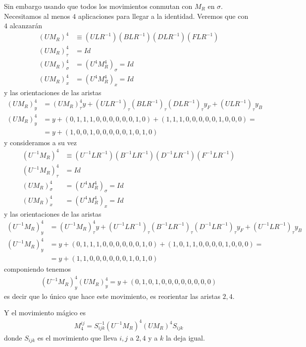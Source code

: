\documentclass{article}
\theoremstyle{definition}
\begin{document}
Sin embargo usando que todos los movimientos conmutan con $M_R$ en $\sigma$. Necesitamos al menos $4$ aplicaciones para llegar a la identidad. Veremos que con $4$ alcanzarán
\begin{align*}
    (UM_R)^4        & \equiv (ULR^{-1})(BLR^{-1})(DLR^{-1})(FLR^{-1}) \\
    (UM_R)^4_\tau   & =Id                                             \\
    (UM_R)^4_\sigma & =(U^4M_R^4)_\sigma=Id                           \\
    (UM_R)^4_x      & =(U^4M_R^4)_x=Id
\end{align*}
y las orientaciones de las aristas
\begin{align*}
    (UM_R)^4_y & =(UM_R)^4_\tau y+(ULR^{-1})_\tau(BLR^{-1})_\tau(DLR^{-1})_\tau y_F+(ULR^{-1})_\tau y_B \\
    (UM_R)^4_y & =y+(0,1,1,1,0,0,0,0,0,0,1,0)+(1,1,1,0,0,0,0,0,1,0,0,0)=                                \\
               & =y+(1,0,0,1,0,0,0,0,0,1,0,1,0)
\end{align*}
y consideramos a su vez
\begin{align*}
    (U^{-1}M_R)^4      & \equiv (U^{-1}LR^{-1})(B^{-1}LR^{-1})(D^{-1}LR^{-1})(F^{-1}LR^{-1}) \\
    (U^{-1}M_R)^4_\tau & =Id                                                                 \\
    (UM_R)^4_\sigma    & =(U^4M_R^4)_\sigma=Id                                               \\
    (UM_R)^4_x         & =(U^4M_R^4)_x=Id
\end{align*}
y las orientaciones de las aristas
\begin{align*}
    (U^{-1}M_R)^4_y & =(U^{-1}M_R)^4_\tau y+(U^{-1}LR^{-1})_\tau(B^{-1}LR^{-1})_\tau(D^{-1}LR^{-1})_\tau y_F+(U^{-1}LR^{-1})_\tau y_B \\
    (U^{-1}M_R)^4_y & =y+(0,1,1,1,0,0,0,0,0,0,1,0)+(1,0,1,1,0,0,0,0,1,0,0,0)=                                                         \\
                    & =y+(1,1,0,0,0,0,0,0,1,0,1,0)
\end{align*}
componiendo tenemos
\begin{align*}
    (U^{-1}M_R)^4_y(UM_R)^4_y=y+(0,1,0,1,0,0,0,0,0,0,0,0)
\end{align*}
es decir que lo único que hace este movimiento, es reorientar las aristas $2,4$.

Y el movimiento mágico es
\begin{align*}
    M^{ij}_4=S_{ijk}^{-1}(U^{-1}M_R)^4(UM_R)^4S_{ijk}
\end{align*}
donde $S_{ijk}$ es el movimiento que lleva $i,j$ a $2,4$ y a $k$ la deja igual.
\end{document}

